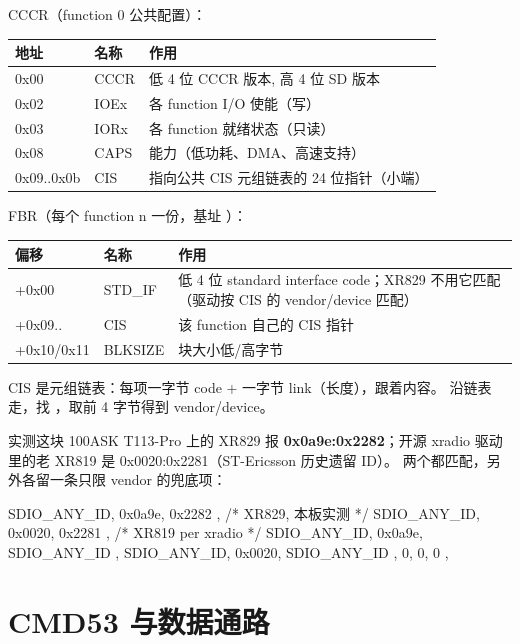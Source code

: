 CCCR（function 0 公共配置）：

\begin{table}[H]
\centering
\begin{tabular}{llp{7.2cm}}
\toprule
地址 & 名称 & 作用 \\
\midrule
0x00 & CCCR & 低 4 位 CCCR 版本, 高 4 位 SD 版本 \\
0x02 & IOEx & 各 function I/O 使能（写） \\
0x03 & IORx & 各 function 就绪状态（只读） \\
0x08 & CAPS & 能力（低功耗、DMA、高速支持） \\
0x09..0x0b & CIS & 指向公共 CIS 元组链表的 24 位指针（小端） \\
\bottomrule
\end{tabular}
\end{table}

FBR（每个 function n 一份，基址 ）：

\begin{table}[H]
\centering
\begin{tabular}{llp{7.6cm}}
\toprule
偏移 & 名称 & 作用 \\
\midrule
+0x00 & STD\_IF & 低 4 位 standard interface code；XR829 不用它匹配（驱动按 CIS 的 vendor/device 匹配） \\
+0x09.. & CIS & 该 function 自己的 CIS 指针 \\
+0x10/0x11 & BLKSIZE & 块大小低/高字节 \\
\bottomrule
\end{tabular}
\end{table}

CIS 是元组链表：每项一字节 code + 一字节 link（长度），跟着内容。 沿链表走，找 ，取前 4 字节得到 vendor/device。

实测这块 100ASK T113-Pro 上的 XR829 报 \textbf{0x0a9e:0x2282}；开源 xradio 驱动里的老 XR819 是 0x0020:0x2281（ST-Ericsson 历史遗留 ID）。 两个都匹配，另外各留一条只限 vendor 的兜底项：

\begin{ccode}
{ SDIO_ANY_ID, 0x0a9e, 0x2282 },        /* XR829, 本板实测 */
{ SDIO_ANY_ID, 0x0020, 0x2281 },        /* XR819 per xradio */
{ SDIO_ANY_ID, 0x0a9e, SDIO_ANY_ID },
{ SDIO_ANY_ID, 0x0020, SDIO_ANY_ID },
{ 0, 0, 0 },
\end{ccode}

\section{CMD53 与数据通路}

